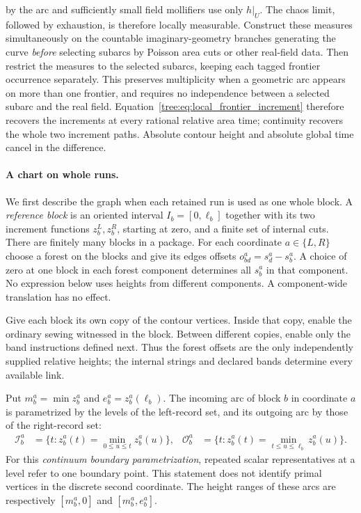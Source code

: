 by the arc and sufficiently small field mollifiers use only $h|_U$.
The chaos limit, followed by exhaustion, is therefore locally
measurable. Construct these measures simultaneously on the countable
imaginary-geometry branches generating the curve \emph{before} selecting
subarcs by Poisson area cuts or other real-field data. Then restrict
the measures to the selected subarcs, keeping each tagged frontier
occurrence separately. This preserves multiplicity when a geometric
arc appears on more than one frontier, and requires no independence
between a selected subarc and the real field.
Equation~\eqref{tree:eq:local_frontier_increment}
therefore recovers the increments at every rational relative area time;
continuity recovers the whole two increment paths.  Absolute contour
height and absolute global time cancel in the difference.

\paragraph{A chart on whole runs.}
We first describe the graph when each retained run is used as one whole
block. A \emph{reference block}
is an oriented interval
$I_b=[0,\ell_b]$ together with its two increment functions
$z_b^L,z_b^R$, starting at zero, and a finite set of internal cuts.
There are finitely many blocks in a package. For each coordinate
$a\in\{L,R\}$ choose a forest on the blocks and give its edges offsets
$o_{bd}^a=s_d^a-s_b^a$.  A choice of zero at one block in each forest
component determines all $s_b^a$ in that component.  No expression below
uses heights from different components.  A component-wide translation
has no effect.

Give each block its own copy of the contour vertices. Inside that copy,
enable the ordinary sewing witnessed in the block. Between different
copies, enable only the band instructions defined next. Thus the forest
offsets are the only independently supplied relative heights; the
internal strings and declared bands determine every available link.

Put $m_b^a=\min z_b^a$ and $e_b^a=z_b^a(\ell_b)$.  The incoming arc of
block $b$ in coordinate $a$ is parametrized by the levels of the
left-record set, and its outgoing arc by those of the right-record set:
\begin{align}\label{tree:eq:chart_arcs}
 \mathcal I_b^a&=\{t:z_b^a(t)=\min_{0\leq u\leq t}z_b^a(u)\},&
 \mathcal O_b^a&=\{t:z_b^a(t)=\min_{t\leq u\leq\ell_b}z_b^a(u)\}.
\end{align}
For this \emph{continuum boundary parametrization}, repeated scalar
representatives at a level refer to one boundary point.  This statement
does not identify primal vertices in the discrete second coordinate.
The
height ranges of these arcs are respectively $[m_b^a,0]$ and
$[m_b^a,e_b^a]$.

